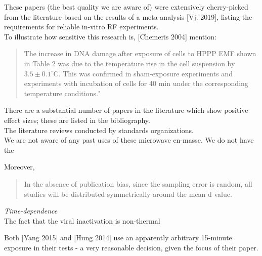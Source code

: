 \documentclass[fleqn,10pt]{article}
\begin{document}
\begin{autem}

These papers (the best quality we are aware of) were extensively cherry-picked from the literature based on the results of a meta-analysis [Vj. 2019], listing the requirements for reliable in-vitro RF experiments.\\

To illustrate how sensitive this research is, [Chemeris 2004] mention:

\begin{quote}

The increase in DNA damage after exposure of cells to HPPP EMF shown in Table 2 was due to the temperature rise in the cell suspension by $3.5\pm0.1^{\circ}  $C. This was confirmed in sham-exposure experiments and experiments with incubation of cells for 40 min under the corresponding temperature conditions."

\end{quote}

There are a substantial number of papers in the literature which show positive effect sizes; these are listed in the bibliography. \\

The literature reviews conducted by standards organizations.\\

We are not aware of any past uses of these microwave en-masse. We do not have the 

Moreover, 
\begin{quote}
	
In the absence of publication bias, since the sampling error is random, all studies will be distributed symmetrically around the mean d value.

\end{quote}


\end{autem}





\clearpage
\printbibliography[heading=none, title={}, keyword={Flagship}]
\printbibliography[heading=none, title={}, keyword={standards}]



\clearpage
{\Large \it Time-dependence}\\

The fact that the viral inactivation is non-thermal

Both [Yang 2015] and [Hung 2014] use an apparently arbitrary 15-minute exposure in their tests - a very reasonable decision, given the focus of their paper. 
\end{document}
